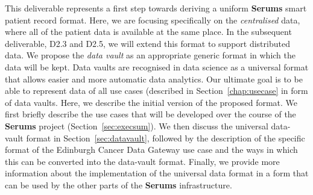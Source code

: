 This deliverable represents a first step towards deriving a uniform \textbf{Serums} smart patient record format. Here, we are focusing specifically on the \emph{centralised} data, where all of the patient data is available at the same place. In the subsequent deliverable, D2.3 and D2.5, we will extend this format to support distributed data. We propose the \emph{data vault} as an appropriate generic format in which the data will be kept. Data vaults are recognised in data science as a universal format that allows easier and more automatic data analytics. Our ultimate goal is to be able to represent data of all use cases (described in Section~\ref{chap:usecase} in form of data vaults. Here, we describe the initial version of the proposed format. We first briefly describe the use cases that will be developed over the course of the \textbf{Serums} project (Section~\ref{sec:execsum}). We then discuss the universal data-vault format in Section~\ref{sec:datavault}, followed by the description of the specific format of the Edinburgh Cancer Data Gateway use case and the ways in which this can be converted into the data-vault format. Finally, we provide more information about the implementation of the universal data format in a form that can be used by the other parts of the \textbf{Serums} infrastructure. 

